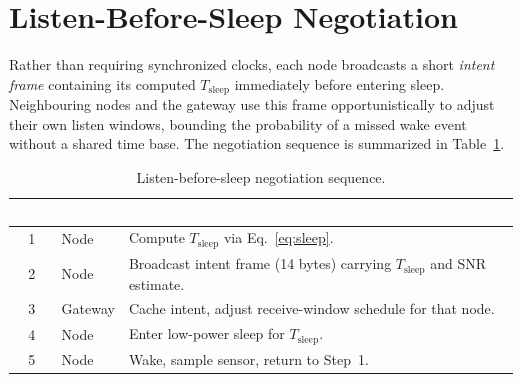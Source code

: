 \section{Listen-Before-Sleep Negotiation}
Rather than requiring synchronized clocks, each node broadcasts a short \emph{intent frame}
containing its computed $T_{\text{sleep}}$ immediately before entering sleep. Neighbouring
nodes and the gateway use this frame opportunistically to adjust their own listen windows,
bounding the probability of a missed wake event without a shared time base. The negotiation
sequence is summarized in Table~\ref{tab:negotiation}.

\begin{table}[H]
\centering
\caption{Listen-before-sleep negotiation sequence.}
\label{tab:negotiation}
\begin{tabularx}{\textwidth}{@{}clX@{}}
\toprule
\rowcolor{nustgreen}
\textcolor{white}{\bfseries Step} & \textcolor{white}{\bfseries Actor} & \textcolor{white}{\bfseries Action} \\
\midrule
1 & Node    & Compute $T_{\text{sleep}}$ via Eq.~\ref{eq:sleep}. \\
\rowcolor{nustmist}
2 & Node    & Broadcast intent frame (14 bytes) carrying $T_{\text{sleep}}$ and SNR estimate. \\
3 & Gateway & Cache intent, adjust receive-window schedule for that node. \\
\rowcolor{nustmist}
4 & Node    & Enter low-power sleep for $T_{\text{sleep}}$. \\
5 & Node    & Wake, sample sensor, return to Step~1. \\
\bottomrule
\end{tabularx}
\end{table}

